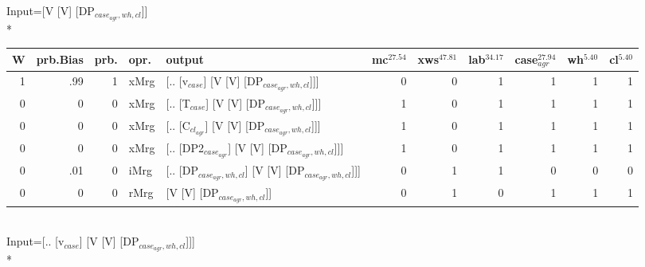 \begingroup\scriptsize Input=[V [V] [DP$_{case_{agr},wh,cl}$]]\\*
\begin{tabularx}{\linewidth}{rrrlXrrrrrr}
\hline
   W &   prb.Bias &   prb. & opr.   & output                                               &   mc$^{27.54}$ &   xws$^{47.81}$ &   lab$^{34.17}$ &   case$_{agr}^{27.94}$ &   wh$^{5.40}$ &   cl$^{5.40}$ \\
\hline
   1 &       .99 &   1 & xMrg & [.. [v$_{case}$] [V [V] [DP$_{case_{agr},wh,cl}$]]]            &            0 &             0 &             1 &                  1 &           1 &           1 \\
   0 &       0 &   0 & xMrg & [.. [T$_{case}$] [V [V] [DP$_{case_{agr},wh,cl}$]]]            &            1 &             0 &             1 &                  1 &           1 &           1 \\
   0 &       0 &   0 & xMrg & [.. [C$_{cl_{agr}}$] [V [V] [DP$_{case_{agr},wh,cl}$]]]          &            1 &             0 &             1 &                  1 &           1 &           1 \\
   0 &       0 &   0 & xMrg & [.. [DP2$_{case_{agr}}$] [V [V] [DP$_{case_{agr},wh,cl}$]]]      &            1 &             0 &             1 &                  1 &           1 &           1 \\
   0 &       .01 &   0 & iMrg & [.. [DP$_{case_{agr},wh,cl}$] [V [V] [DP$_{case_{agr},wh,cl}$]]] &            0 &             1 &             1 &                  0 &           0 &           0 \\
   0 &       0 &   0 & rMrg & [V [V] [DP$_{case_{agr},wh,cl}$]]                          &            0 &             1 &             0 &                  1 &           1 &           1 \\
\hline
\end{tabularx}\endgroup\\
\begingroup\scriptsize Input=[.. [v$_{case}$] [V [V] [DP$_{case_{agr},wh,cl}$]]]\\*
